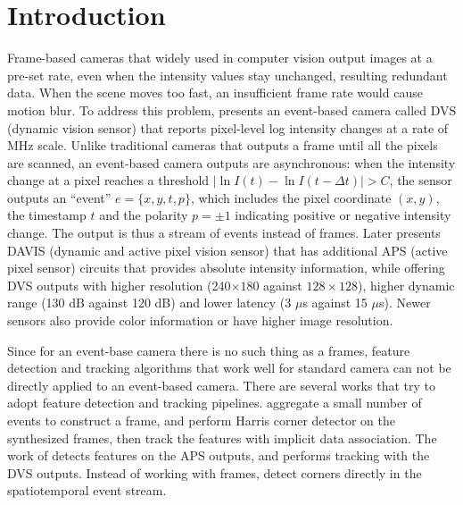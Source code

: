 \chapter{Introduction}
\label{sec:introduction}

Frame-based cameras that widely used in computer vision output images
at a pre-set rate, even when the intensity values stay unchanged,
resulting redundant data. When the scene moves too fast, an
insufficient frame rate would cause motion blur. To address this
problem, \citet{lichtsteiner2008128} presents an event-based camera
called DVS (dynamic vision sensor) that reports pixel-level log
intensity changes at a rate of \unit{MHz} scale. Unlike traditional
cameras that outputs a frame until all the pixels are scanned, an
event-based camera outputs are asynchronous: when the intensity change
at a pixel reaches a threshold
$\mid\ln{I(t)}-\ln{I(t-\Delta t)}\mid>C$, the sensor outputs an
``event'' $e=\{x,y,t,p\}$, which includes the pixel coordinate
$(x, y)$, the timestamp $t$ and the polarity $p=\pm1$ indicating
positive or negative intensity change. The output is thus a stream of
events instead of frames. Later \citet{brandli2014240} presents DAVIS
(dynamic and active pixel vision sensor) that has additional APS
(active pixel sensor) circuits that provides absolute intensity
information, while offering DVS outputs with higher resolution
(240$\times180$ against $128\times128$), higher dynamic range (130 dB
against 120 dB) and lower latency (3 $\mu$s against 15 $\mu$s). Newer
sensors also provide color
information\citep{li2015design,moeys2018sensitive} or have higher
image resolution\citep{son20174}.

Since for an event-base camera there is no such thing as a frames,
feature detection and tracking algorithms that work well for standard
camera can not be directly applied to an event-based camera. There are
several works that try to adopt feature detection and tracking
pipelines. \citet{zhu2017event} aggregate a small number of
events to construct a frame, and perform Harris corner detector
\citep{harris1988combined} on the synthesized frames, then track the
features with implicit data association. The work of
\citet{tedaldi2016feature} detects features on the APS outputs, and
performs tracking with the DVS outputs. Instead of working with
frames, \citet{mueggler2017fast} detect corners directly in the
spatiotemporal event stream.

